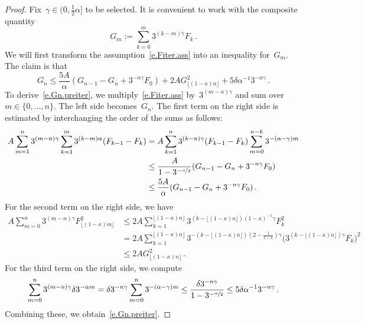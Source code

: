 \documentclass[11pt,twoside]{article} %
\numberwithin{equation}{section}
\theoremstyle{definition}
\begin{document}
\begin{proof} 
Fix~$\gamma \in (0,\frac12 \alpha]$ to be selected. It is convenient to work with the composite quantity 
\begin{equation*}
G_m := \sum_{k=0}^m 3^{(k-m)\gamma} F_k
\,.
\end{equation*}
We will first transform the assumption~\eqref{e.Fiter.ass} into an inequality for~$G_m$. 
The claim is that 
\begin{equation}
\label{e.Gn.preiter}
G_n \leq 
\frac{5A}{\alpha} (G_{n-1} - G_{n} +  3^{-n\gamma} F_{0})
+
2A G_{\lfloor (1-\kappa) n \rfloor}^2 
+
5\delta \alpha^{-1} 3^{-n\gamma}\,.
\end{equation}
To derive~\eqref{e.Gn.preiter}, we multiply~\eqref{e.Fiter.ass} by~$3^{(m-n)\gamma}$ and sum over~$m \in\{ 0,\ldots,n\}$. The left side becomes~$G_n$. The first term on the right side is estimated by interchanging the order of the sums as follows:
\begin{align*} 
A \sum_{m=1}^n 3^{(m-n)\gamma} 
\sum_{k=1}^m 3^{(k-m)\alpha} (F_{k-1} - F_k) 
& =
A \sum_{k=1}^n 3^{(k-n)\gamma}  (F_{k-1} - F_k)   
\sum_{m=0}^{n-k} 3^{-(\alpha - \gamma)m}  
\\ & 
\leq 
\frac{A}{1-3^{-\nicefrac \alpha2}} (G_{n-1} - G_{n} +  3^{-n\gamma} F_{0})
\\ & 
\leq 
\frac{5A}{\alpha} (G_{n-1} - G_{n} +  3^{-n\gamma} F_{0})
\,.
\end{align*}
For the second term on the right side, we have 
\begin{align*}
A \sum_{m=0}^n 
3^{(m-n)\gamma} F_{\lfloor (1-\kappa) m \rfloor}^2 
& \leq 
2A 
\sum_{k=1}^{\lfloor (1-\kappa) n \rfloor}
3^{( k -\lfloor (1-\kappa) n \rfloor )(1-\kappa)^{-1} \gamma} 
F_{k}^2 
\\ & 
= 
2A 
\sum_{k=1}^{\lfloor (1-\kappa) n \rfloor}
3^{- ( k -\lfloor (1-\kappa) n \rfloor ) ( 2 - \frac{1}{1-\kappa} ) \gamma}
\bigl( 
3^{( k -\lfloor (1-\kappa) n \rfloor ) \gamma}
F_{k} \bigr)^2 
\\ & 
\leq 
2A G_{\lfloor (1-\kappa) n \rfloor}^2
\,.
\end{align*}
For the third term on the right side, we compute
\begin{equation*}
\sum_{ m=0}^n 3^{ (m-n)\gamma} \delta 3^{-\alpha m} 
=
\delta 3^{-n\gamma} \sum_{ m=0}^n 3^{-(\alpha-\gamma)m} 
\leq 
\frac{\delta  3^{-n\gamma}}{1-3^{-\nicefrac \alpha2}}
\leq 
5\delta \alpha^{-1}  3^{-n\gamma}  \,.
\end{equation*}
Combining these, we obtain~\eqref{e.Gn.preiter}.


\end{proof}
\end{document}
